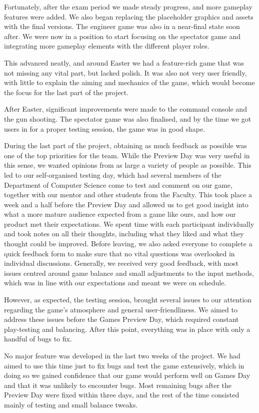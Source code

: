 \documentclass[a4paper,11pt]{article}
\begin{document}
Fortunately, after the exam period we made steady progress, and more gameplay features were added. We also began replacing the placeholder graphics and assets with the final versions. The engineer game was also in a near-final state soon after. We were now in a position to start focusing on the spectator game and integrating more gameplay elements with the different player roles.

This advanced neatly, and around Easter we had a feature-rich game that was not missing any vital part, but lacked polish. It was also not very user friendly, with little to explain the aiming and mechanics of the game, which would become the focus for the last part of the project.

After Easter, significant improvements were made to the command console and the gun shooting. The spectator game was also finalised, and by the time we got users in for a proper testing session, the game was in good shape.

During the last part of the project, obtaining as much feedback as possible was one of the top priorities for the team. While the Preview Day was very useful in this sense, we wanted opinions from as large a variety of people as possible. This led to our self-organised testing day, which had several members of the Department of Computer Science come to test and comment on our game, together with our mentor and other students from the Faculty. This took place a week and a half before the Preview Day and allowed us to get good insight into what a more mature audience expected from a game like ours, and how our product met their expectations. We spent time with each participant individually and took notes on all their thoughts, including what they liked and what they thought could be improved. Before leaving, we also asked everyone to complete a quick feedback form to make sure that no vital questions was overlooked in individual discussions. Generally, we received very good feedback, with most issues centred around game balance and small adjustments to the input methods, which was in line with our expectations and meant we were on schedule.

However, as expected, the testing session, brought several issues to our attention regarding the game’s atmosphere and general user-friendliness. We aimed to address these issues before the Games Preview Day, which required constant play-testing and balancing. After this point, everything was in place with only a handful of bugs to fix.

No major feature was developed in the last two weeks of the project. We had aimed to use this time just to fix bugs and test the game extensively, which in doing so we gained confidence that our game would perform well on Games Day and that it was unlikely to encounter bugs. Most remaining bugs after the Preview Day were fixed within three days, and the rest of the time consisted mainly of testing and small balance tweaks.
\end{document}
